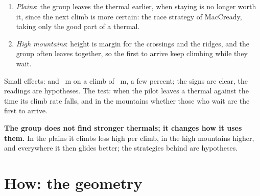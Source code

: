 \documentclass[10pt,a4paper]{article}
\newcommand{\Home}{\item[\textcolor{answer}{\textbf{Take home.}}]\color{black}}
\newcommand{\Com}{\item[\textcolor{black}{\textbf{Comment.}}]\color{black}}
\newenvironment{step}{\begin{description}[leftmargin=0pt, itemsep=7pt, topsep=8pt]}{\end{description}}
\begin{document}
\begin{step}
\begin{enumerate}
  \item \emph{Plains}: the group leaves the thermal earlier, when staying is no longer worth it, since the next
    climb is more certain: the race strategy of MacCready, taking only the good part of a thermal.
  \item \emph{High mountains}: height is margin for the crossings and the ridges, and the group often leaves
    together, so the first to arrive keep climbing while they wait.
  \end{enumerate}
\Com Small effects: \PhGainGAPlains{} and \PhGainGAHighMtn~m on a climb of \PhGainAAll~m, a few percent; the signs
  are clear, the readings are hypotheses. The test: when the pilot leaves a thermal against the time its climb rate falls, and in the
  mountains whether those who wait are the first to arrive.
\Home \textbf{The group does not find stronger thermals; it changes how it uses them.} In the plains it climbs less
  high per climb, in the high mountains higher, and everywhere it then glides better; the strategies behind are
  hypotheses.
\end{step}

\section{How: the geometry}\label{ch:geometry}
\end{document}
